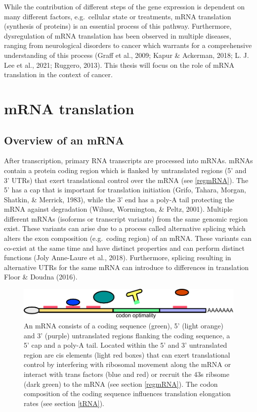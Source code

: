 \documentclass[
  12pt,
  openany]{book}
\begin{document}
While the contribution of different steps of the gene expression is dependent on many different factors, e.g.~cellular state or treatments, mRNA translation (synthesis of proteins) is an essential process of this pathway. Furthermore, dysregulation of mRNA translation has been observed in multiple diseases, ranging from neurological disorders to cancer which warrants for a comprehensive understanding of this process (Graff et al., 2009; Kapur \& Ackerman, 2018; L. J. Lee et al., 2021; Ruggero, 2013). This thesis will focus on the role of mRNA translation in the context of cancer.
\newline

\section{mRNA translation}
\subsection{Overview of an mRNA}

After transcription, primary RNA transcripts are processed into mRNAs. mRNAs contain a protein coding region which is flanked by untranslated regions (5' and 3' UTRs) that exert translational control over the mRNA (see \ref{regmRNA}). The 5' has a cap that is important for translation initiation (Grifo, Tahara, Morgan, Shatkin, \& Merrick, 1983), while the 3' end has a poly-A tail protecting the mRNA against degradation (Wilusz, Wormington, \& Peltz, 2001). Multiple different mRNAs (isoforms or transcript variants) from the same genomic region exist. These variants can arise due to a process called alternative splicing which alters the exon composition (e.g.~coding region) of an mRNA. These variants can co-exist at the same time and have distinct properties and can perform distinct functions (Joly Anne-Laure et al., 2018). Furthermore, splicing resulting in alternative UTRs for the same mRNA can introduce to differences in translation Floor \& Doudna (2016).

\begin{figure}
  \includegraphics{./figures/UTRFeatures.pdf}
  \caption{ An mRNA consists of a coding sequence (green), 5' (light orange) and 3' (purple) untranslated regions flanking the coding sequence, a 5' cap and a poly-A tail. Located within the 5' and 3' untranslated region are cis elements (light red boxes) that can exert translational control by interfering with ribosomal movement along the mRNA or interact with trans factors (blue and red) or recruit the 43s ribsome (dark green) to the mRNA (see section \ref{regmRNA}). The codon composition of the coding sequence influences translation elongation rates (see section \ref{tRNA}).   
 \label{fig:UTRFeat}}
\end{figure}
\clearpage
\end{document}
